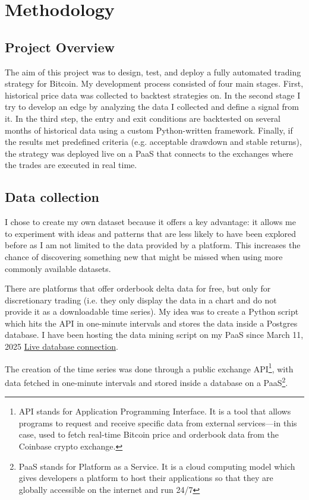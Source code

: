 \documentclass[12pt]{article}
\begin{document}
\newpage
\section{Methodology}

\subsection{Project Overview}
The aim of this project was to design, test, and deploy a fully automated trading strategy for Bitcoin.
My development process consisted of four main stages. First, historical price data was collected to backtest strategies on.
In the second stage I try to develop an edge by analyzing the data I collected and define a signal from it.
In the third step, the entry and exit conditions are backtested on several months of historical data using a custom Python-written framework. Finally, if the results met predefined criteria (e.g. acceptable drawdown and stable returns), the strategy was deployed live on a PaaS that connects to the exchanges where the trades are executed in real time.

\subsection{Data collection}



I chose to create my own dataset because it offers a key advantage: it allows me to experiment with ideas and patterns that are less likely to have been explored before as I am not limited to the data provided by a platform. 
This increases the chance of discovering something new that might be missed when using more commonly available datasets.

There are platforms that offer orderbook delta data for free, but only for discretionary trading (i.e. they only display the data in a chart and do not provide it as a downloadable time series). My idea was to create a Python script which hits the API in one-minute intervals and stores the data inside a Postgres database. I have been hosting the data mining script on my PaaS since March 11, 2025 \href{https://customchart-production.up.railway.app/#}{Live database connection}.

The creation of the time series was done through a public exchange API\footnote{API stands for Application Programming Interface. It is a tool that allows programs to request and receive specific data from external services—in this case, used to fetch real-time Bitcoin price and orderbook data from the Coinbase crypto exchange.}, with data fetched in one-minute intervals and stored inside a database on a PaaS\footnote{PaaS stands for Platform as a Service. It is a cloud computing model which gives developers a platform to host their applications so that they are globally accessible on the internet and run 24/7}.
\end{document}
